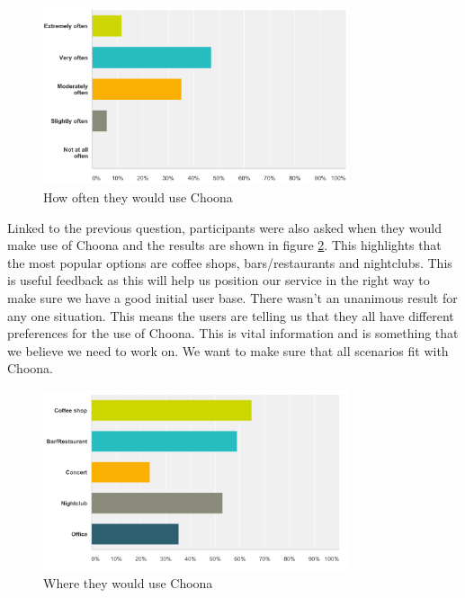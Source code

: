     \begin{figure}[h!]
      \centering
      \includegraphics[width=0.8\textwidth]{./img/how_often.png}
      \caption{How often they would use Choona}
      \label{fig:how_often}
    \end{figure}

Linked to the previous question, participants were also asked when they would make use of Choona and the results are shown in figure \ref{fig:where}.  This highlights that the most popular options are coffee shops, bars/restaurants and nightclubs.  This is useful feedback as this will help us position our service in the right way to make sure we have a good initial user base. There wasn't an unanimous result for any one situation. This means the users are telling us that they all have different preferences for the use of Choona.  This is vital information and is something that we believe we need to work on.  We want to make sure that all scenarios fit with Choona.  \\

    \begin{figure}[h!]
      \centering
      \includegraphics[width=0.8\textwidth]{./img/use_situation.png}
      \caption{Where they would use Choona}
      \label{fig:where}
    \end{figure}


